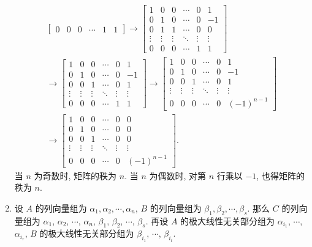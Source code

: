 \begin{enumerate}
\begin{gather*}
\begin{bmatrix}
                0 & 0 & 0 & \cdots & 1 & 1   
            \end{bmatrix}
            \rightarrow
            \begin{bmatrix}
                1 & 0 & 0 & \cdots & 0 & 1 \\
                0 & 1 & 0 & \cdots & 0 & -1 \\
                0 & 1 & 1 & \cdots & 0 & 0 \\
                \vdots & \vdots & \vdots & \ddots & \vdots & \vdots \\
                0 & 0 & 0 & \cdots & 1 & 1   
            \end{bmatrix} \\
            \rightarrow
            \begin{bmatrix}
                1 & 0 & 0 & \cdots & 0 & 1 \\
                0 & 1 & 0 & \cdots & 0 & -1 \\
                0 & 0 & 1 & \cdots & 0 & 1 \\
                \vdots & \vdots & \vdots & \ddots & \vdots & \vdots \\
                0 & 0 & 0 & \cdots & 1 & 1   
            \end{bmatrix}
            \rightarrow
            \begin{bmatrix}
                1 & 0 & 0 & \cdots & 0 & 1 \\
                0 & 1 & 0 & \cdots & 0 & -1 \\
                0 & 0 & 1 & \cdots & 0 & 1 \\
                \vdots & \vdots & \vdots & \ddots & \vdots & \vdots \\
                0 & 0 & 0 & \cdots & 0 & (-1)^{n-1}   
            \end{bmatrix} \\
            \rightarrow
            \begin{bmatrix}
                1 & 0 & 0 & \cdots & 0 & 0 \\
                0 & 1 & 0 & \cdots & 0 & 0 \\
                0 & 0 & 1 & \cdots & 0 & 0 \\
                \vdots & \vdots & \vdots & \ddots & \vdots & \vdots \\
                0 & 0 & 0 & \cdots & 0 & (-1)^{n-1}   
            \end{bmatrix}.
        \end{gather*}
        当 $n$ 为奇数时, 矩阵的秩为 $n$. 当 $n$ 为偶数时, 对第 $n$ 行乘以 $-1$, 也得矩阵的秩为 $n$.
    \item %
        设 $A$ 的列向量组为 $\alpha_1, \alpha_2, \cdots, \alpha_n$, $B$ 的列向量组为 $\beta_1, \beta_2, \cdots, \beta_s$.
        那么 $C$ 的列向量组为 $\alpha_1$, $\alpha_2$, $\cdots$, $\alpha_n$, $\beta_1$, $\beta_2$, $\cdots$, $\beta_s$.
        再设 $A$ 的极大线性无关部分组为 $\alpha_{i_1}$, $\cdots$, $\alpha_{i_r}$, $B$ 的极大线性无关部分组为 $\beta_{i_1}$, $\cdots$, $\beta_{i_t}$.
        

\end{enumerate}
